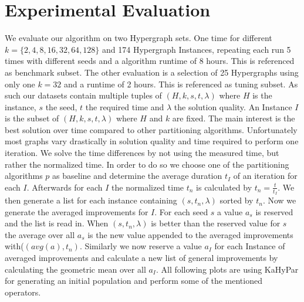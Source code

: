 \documentclass[a4paper,12pt,bibtotoc,titlepage, liststotoc,BCOR7mm,headsepline,pointlessnumbers]{scrbook}
\numberwithin{equation}{section}
\begin{document}
\chapter{Experimental Evaluation}
We evaluate our algorithm on two Hypergraph sets. One time for different $k = \{2,4,8,16,32,64,128\}$ and 174 Hypergraph Instances, repeating
each run 5 times with different seeds and a algorithm runtime of 8 hours. This is referenced as benchmark subset. The other evaluation is a
selection of 25 Hypergraphs using only one $k = 32$ and a runtime of 2 hours. This is referenced as tuning subset. 
As such our datasets contain multiple tuples of $(H, k, s, t, \lambda)$ where $H$ is the instance, $s$ the seed, $t$ the required time and $\lambda$ the solution quality. An Instance $I$ is the subset of $(H, k, s, t, \lambda)$ where $H$ and $k$ are fixed.
The main interest is the best solution over time compared to other partitioning algorithms. Unfortunately most graphs vary drastically in solution quality and time required to perform one iteration. We solve the time differences by not using the measured time, but rather the normalized time. 
In order to do so we choose one of the partitioning algorithms $p$ as baseline and determine the average duration $t_I$ of an iteration for each $I$. Afterwards for each $I$ the normalized time $t_n$ is calculated by $t_n = \frac{t}{t_I}$. We then generate a list for each instance containing $(s, t_n, \lambda)$ sorted by $t_n$. Now we generate the averaged improvements for $I$. For each seed $s$ a value $a_s$ is reserved and the list is read in. When $(s, t_n, \lambda)$ is better than the reserved value for $s$ the average over all $a_s$ 
is the new value appended to the averaged improvements with($(avg(a), t_n)$. Similarly we now reserve a value $a_I$ for each Instance of averaged improvements and calculate a new list of general improvements by calculating the geometric mean over all $a_I$. 
All following plots are using KaHyPar for generating an initial population and perform some of the mentioned operators.
\end{document}
